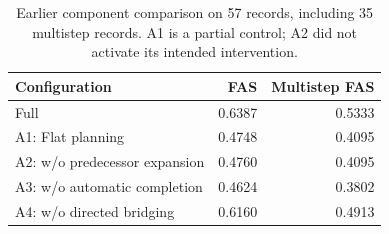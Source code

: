 \begin{table}[t]
\caption{Earlier component comparison on 57 records, including 35 multistep records. A1 is a partial control; A2 did not activate its intended intervention.}
\label{tab:ablation}
\centering
\begin{tabularx}{\columnwidth}{@{}Xrr@{}}
\toprule
Configuration & FAS & Multistep FAS \\
\midrule
Full & 0.6387 & 0.5333 \\
A1: Flat planning & 0.4748 & 0.4095 \\
A2: w/o predecessor expansion & 0.4760 & 0.4095 \\
A3: w/o automatic completion & 0.4624 & 0.3802 \\
A4: w/o directed bridging & 0.6160 & 0.4913 \\
\bottomrule
\end{tabularx}
\end{table}
